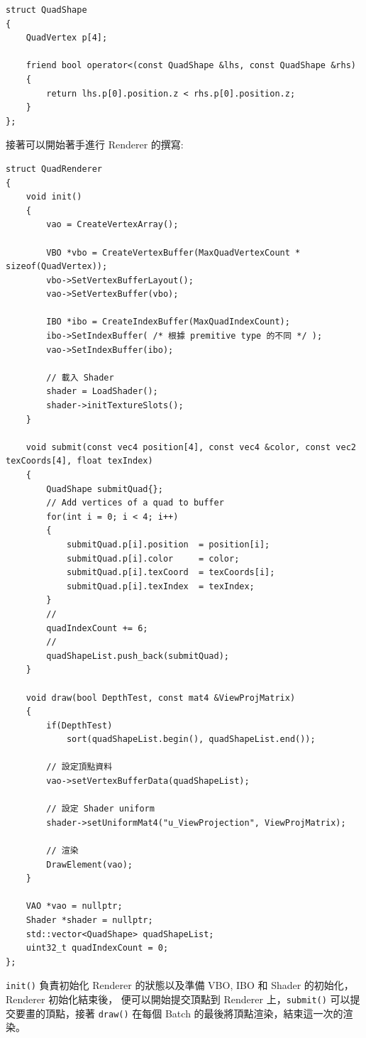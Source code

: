 \begin{lstlisting}
struct QuadShape
{
    QuadVertex p[4];

    friend bool operator<(const QuadShape &lhs, const QuadShape &rhs)
    {
        return lhs.p[0].position.z < rhs.p[0].position.z;
    }
};
\end{lstlisting}

接著可以開始著手進行 Renderer 的撰寫:

\begin{lstlisting}
struct QuadRenderer
{
    void init()
    {
        vao = CreateVertexArray();
        
        VBO *vbo = CreateVertexBuffer(MaxQuadVertexCount * sizeof(QuadVertex));
        vbo->SetVertexBufferLayout();
        vao->SetVertexBuffer(vbo);
        
        IBO *ibo = CreateIndexBuffer(MaxQuadIndexCount);
        ibo->SetIndexBuffer( /* 根據 premitive type 的不同 */ );
        vao->SetIndexBuffer(ibo);
        
        // 載入 Shader
        shader = LoadShader();
        shader->initTextureSlots();
    }
    
    void submit(const vec4 position[4], const vec4 &color, const vec2 texCoords[4], float texIndex)
    {
        QuadShape submitQuad{};
        // Add vertices of a quad to buffer
        for(int i = 0; i < 4; i++)
        {
            submitQuad.p[i].position  = position[i];
            submitQuad.p[i].color     = color;
            submitQuad.p[i].texCoord  = texCoords[i];
            submitQuad.p[i].texIndex  = texIndex;
        }
        //
        quadIndexCount += 6;
        //
        quadShapeList.push_back(submitQuad);
    }
    
    void draw(bool DepthTest, const mat4 &ViewProjMatrix)
    {
        if(DepthTest)
            sort(quadShapeList.begin(), quadShapeList.end());
            
        // 設定頂點資料
        vao->setVertexBufferData(quadShapeList);
        
        // 設定 Shader uniform
        shader->setUniformMat4("u_ViewProjection", ViewProjMatrix);
        
        // 渲染
        DrawElement(vao);
    }
    
    VAO *vao = nullptr;
    Shader *shader = nullptr;
    std::vector<QuadShape> quadShapeList;
    uint32_t quadIndexCount = 0;
};
\end{lstlisting}

\lstinline{init()} 負責初始化 Renderer 的狀態以及準備 VBO, IBO 和 Shader 的初始化，Renderer 初始化結束後，
便可以開始提交頂點到 Renderer 上，\lstinline{submit()} 可以提交要畫的頂點，接著 \lstinline{draw()} 在每個 Batch 的最後將頂點渲染，結束這一次的渲染。

